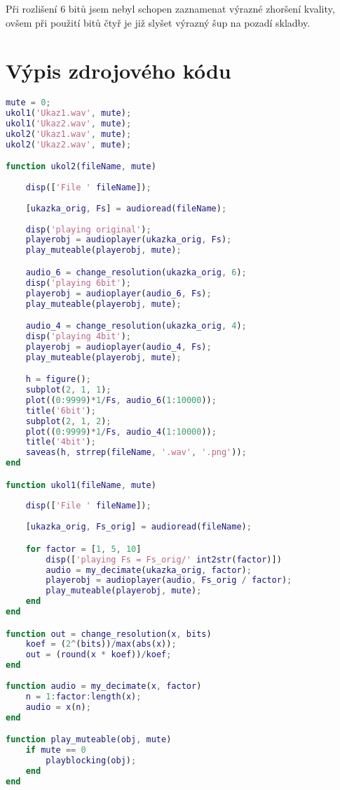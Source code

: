 \documentclass[11pt, a4paper]{article}
\begin{document}
        Při rozlišení 6 bitů jsem nebyl schopen zaznamenat výrazné 
        zhoršení kvality, ovšem při použití bitů čtyř je již slyšet 
        výrazný šup na pozadí skladby.
        
    \section{Výpis zdrojového kódu}
    
\begin{lstlisting}[language=matlab, frame=single]    
mute = 0;
ukol1('Ukaz1.wav', mute);
ukol1('Ukaz2.wav', mute);
ukol2('Ukaz1.wav', mute);
ukol2('Ukaz2.wav', mute);

function ukol2(fileName, mute)
    
    disp(['File ' fileName]);
    
    [ukazka_orig, Fs] = audioread(fileName);
    
    disp('playing original');
    playerobj = audioplayer(ukazka_orig, Fs);    
    play_muteable(playerobj, mute);

    audio_6 = change_resolution(ukazka_orig, 6);
    disp('playing 6bit');
    playerobj = audioplayer(audio_6, Fs);
    play_muteable(playerobj, mute);

    audio_4 = change_resolution(ukazka_orig, 4);
    disp('playing 4bit');
    playerobj = audioplayer(audio_4, Fs);
    play_muteable(playerobj, mute);

    h = figure();
    subplot(2, 1, 1);
    plot((0:9999)*1/Fs, audio_6(1:10000));
    title('6bit');
    subplot(2, 1, 2);
    plot((0:9999)*1/Fs, audio_4(1:10000));
    title('4bit');
    saveas(h, strrep(fileName, '.wav', '.png'));
end

function ukol1(fileName, mute)
    
    disp(['File ' fileName]);
    
    [ukazka_orig, Fs_orig] = audioread(fileName);

    for factor = [1, 5, 10]
        disp(['playing Fs = Fs_orig/' int2str(factor)])
        audio = my_decimate(ukazka_orig, factor);
        playerobj = audioplayer(audio, Fs_orig / factor);
        play_muteable(playerobj, mute);
    end
end

function out = change_resolution(x, bits)
    koef = (2^(bits))/max(abs(x));
    out = (round(x * koef))/koef;
end
    
function audio = my_decimate(x, factor)
    n = 1:factor:length(x);
    audio = x(n);
end

function play_muteable(obj, mute)
    if mute == 0
        playblocking(obj);
    end
end
\end{lstlisting}
    
\end{document}
